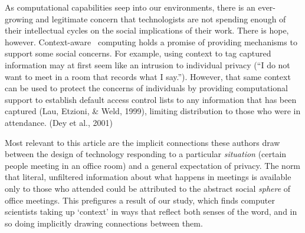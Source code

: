 \documentclass[../thesis.tex]{subfiles}
\begin{document}
\bigskip

As computational
capabilities seep into our environments, there is an ever-growing and
legitimate concern that technologists are not spending enough of their
intellectual cycles on the social implications of their work. There is
hope, however. Context-aware \ computing holds a promise of providing
mechanisms to support some social concerns. For example, using context
to tag captured information may at first seem like an intrusion to
individual privacy (``I do not want to meet in a room
that records what I say.''). However, that same
context can be used to protect the concerns of individuals by providing
computational support to establish default access control lists to any
information that has been captured (Lau, Etzioni, \& Weld, 1999),
limiting distribution to those who were in attendance. (Dey et al.,
2001)


\bigskip

\textcolor[rgb]{0.13333334,0.13333334,0.13333334}{Most relevant to this
article are the implicit connections these authors draw between the
design of technology responding to a particular
}\textit{\textcolor[rgb]{0.13333334,0.13333334,0.13333334}{situation}}\textcolor[rgb]{0.13333334,0.13333334,0.13333334}{
(certain people meeting in an office room) and a general expectation of
privacy. The norm that literal, unfiltered information about what
happens in meetings is available only to those who attended could be
attributed to the abstract social
}\textit{\textcolor[rgb]{0.13333334,0.13333334,0.13333334}{sphere}}\textcolor[rgb]{0.13333334,0.13333334,0.13333334}{
of office meetings. This prefigures a result of our study, which finds
computer scientists taking up `context'
in ways that reflect both senses of the word, and in so doing
implicitly drawing connections between them.}


\bigskip
\end{document}

